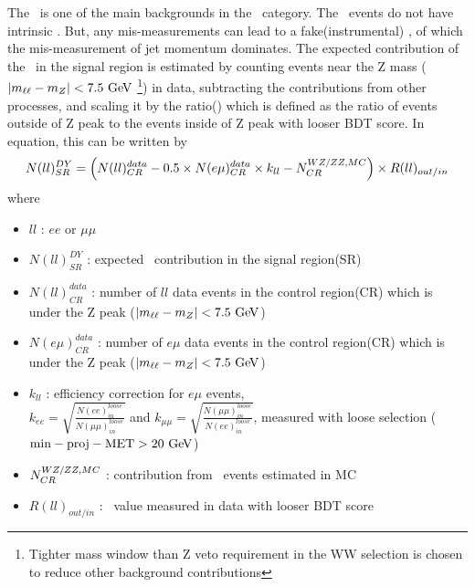 The \dyll\ is one of the main backgrounds in the \SF\ category.   
The \dyll\ events do not have intrinsic \met. But, any mis-measurements can 
lead to a fake(instrumental) \met, of which the mis-measurement of jet momentum dominates.  
The expected contribution of the \dyll\ in the signal region is estimated by 
counting events near the Z mass ($|m_{\ell\ell} - m_Z| < 7.5~\mathrm{Ge\kern -0.1em V}$
\footnote{Tighter mass window than Z veto requirement in the WW selection is chosen
to reduce other background contributions}) in data, subtracting 
the contributions from other processes, and scaling it by the ratio(\routin) 
which is defined as the ratio of events outside of Z peak to the events inside
of Z peak with looser BDT score. In equation, this can be written by 
\begin{eqnarray} 
N(ll)^{DY}_{SR} 
= 
\left( N(ll)_{CR}^{data} - 0.5 \times N(e\mu)_{CR}^{data} \times k_{ll} - N_{CR}^{WZ/ZZ, MC} \right) 
\times R(ll)_{out/in}
\end{eqnarray} 
where 
\begin{itemize}
\item $ll$ : $ee$ or $\mu\mu$ 
\item $N(ll)^{DY}_{SR}$ : expected \dyll\ contribution in the signal region(SR) 
\item $N(ll)_{CR}^{data}$ : number of $ll$ data events in the control region(CR) which is 
      under the Z peak ($|m_{\ell\ell} - m_Z| < 7.5~\mathrm{Ge\kern -0.1em V}$)  
\item $N(e\mu)_{CR}^{data}$ : number of $e\mu$ data events in the control region(CR) which is 
      under the Z peak ($|m_{\ell\ell} - m_Z| < 7.5~\mathrm{Ge\kern -0.1em V}$)  
\item $k_{ll}$ : efficiency correction for $e\mu$ events,  \\
      $\displaystyle k_{ee} = \sqrt{\frac{N(ee)_{in}^{loose}}{N(\mu\mu)_{in}^{loose}}}$  and   
      $\displaystyle k_{\mu\mu} = \sqrt{\frac{N(\mu\mu)_{in}^{loose}}{N(ee)_{in}^{loose}}}$,
      measured with loose selection ($\mathrm{min-proj-MET} > 20~\mathrm{Ge\kern -0.1em V}$) 
\item $N_{CR}^{WZ/ZZ, MC}$ : contribution from \vv\ events estimated in MC
\item $R(ll)_{out/in}$ : \routin\ value measured in data with looser BDT score
\end{itemize}


